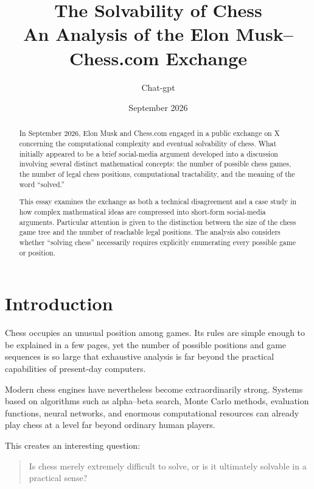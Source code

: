 \documentclass[12pt,a4paper]{article}
\title{
    The Solvability of Chess\\
    \large An Analysis of the Elon Musk--Chess.com Exchange
}
\author{Chat-gpt}
\date{September 2026}
\begin{document}
\maketitle

\begin{abstract}

In September 2026, Elon Musk and Chess.com engaged in a public
exchange on X concerning the computational complexity and eventual
solvability of chess. What initially appeared to be a brief social-media
argument developed into a discussion involving several distinct
mathematical concepts: the number of possible chess games, the number
of legal chess positions, computational tractability, and the meaning
of the word ``solved.''

This essay examines the exchange as both a technical disagreement and
a case study in how complex mathematical ideas are compressed into
short-form social-media arguments. Particular attention is given to
the distinction between the size of the chess game tree and the number
of reachable legal positions. The analysis also considers whether
``solving chess'' necessarily requires explicitly enumerating every
possible game or position.

\end{abstract}


\tableofcontents

\newpage


\section{Introduction}

Chess occupies an unusual position among games. Its rules are simple
enough to be explained in a few pages, yet the number of possible
positions and game sequences is so large that exhaustive analysis is
far beyond the practical capabilities of present-day computers.

Modern chess engines have nevertheless become extraordinarily strong.
Systems based on algorithms such as alpha--beta search, Monte Carlo
methods, evaluation functions, neural networks, and enormous
computational resources can already play chess at a level far beyond
ordinary human players.

This creates an interesting question:

\begin{quote}
    Is chess merely extremely difficult to solve, or is it ultimately
    solvable in a practical sense?
\end{quote}
\end{document}
